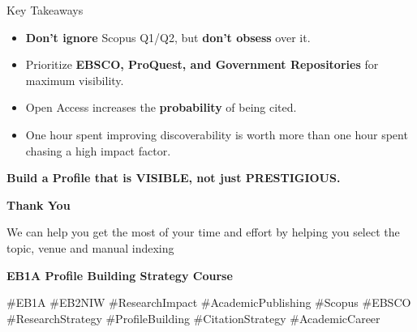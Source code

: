 \documentclass[10pt, aspectratio=169]{beamer}
\begin{document}
	\begin{frame}{Key Takeaways}
		\begin{itemize}
			\item \textbf{Don't ignore} Scopus Q1/Q2, but \textbf{don't obsess} over it.
			\item Prioritize \textbf{EBSCO, ProQuest, and Government Repositories} for maximum visibility.
			\item Open Access increases the \textbf{probability} of being cited.
			\item One hour spent improving discoverability is worth more than one hour spent chasing a high impact factor.
		\end{itemize}
		\vspace{0.5cm}
		\begin{center}
			\textcolor{myblue}{\Large \textbf{Build a Profile that is VISIBLE, not just PRESTIGIOUS.}}
		\end{center}
	\end{frame}
	
	\begin{frame}[plain]
		\begin{center}
			\Huge{\textbf{Thank You}}
			\vspace{1cm}
			
			\Large{We can help you get the most of your time and effort by helping you select the topic, venue and manual indexing}
			
			\textbf{EB1A Profile Building Strategy Course}
			\vspace{1cm}
			
			\tiny{\#EB1A \#EB2NIW \#ResearchImpact \#AcademicPublishing \#Scopus \#EBSCO \#ResearchStrategy \#ProfileBuilding \#CitationStrategy \#AcademicCareer}
		\end{center}
	\end{frame}
	
\end{document}
